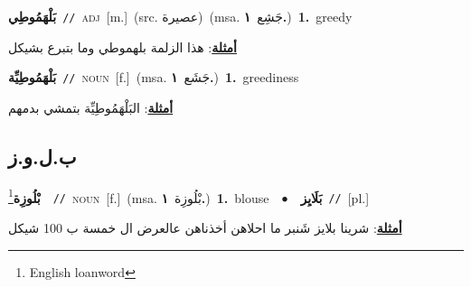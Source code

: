 \documentclass[10pt,a4paper,twoside]{article} %
\begin{document}
\begin{multicols}{2}
{\setlength\topsep{0pt}\textbf{\foreignlanguage{arabic}{بَلْهَمُوطِي}}\ {\color{gray}\texttt{//}\color{black}}\ \textsc{adj}\ [m.]\ (src. \color{gray}\foreignlanguage{arabic}{عصيرة}\color{black})\ \color{gray}(msa. \foreignlanguage{arabic}{جَشِع}~\foreignlanguage{arabic}{\textbf{١.}})\color{black}\ \textbf{1.}~greedy\  \begin{flushright}\color{gray}\foreignlanguage{arabic}{\textbf{\underline{\foreignlanguage{arabic}{أمثلة}}}: هذا الزلمة بلهموطي وما بتبرع بشيكل}\end{flushright}\color{black}} \vspace{2mm}

{\setlength\topsep{0pt}\textbf{\foreignlanguage{arabic}{بَلْهَمُوطِيِّة}}\ {\color{gray}\texttt{//}\color{black}}\ \textsc{noun}\ [f.]\ \color{gray}(msa. \foreignlanguage{arabic}{جَشَع}~\foreignlanguage{arabic}{\textbf{١.}})\color{black}\ \textbf{1.}~greediness\  \begin{flushright}\color{gray}\foreignlanguage{arabic}{\textbf{\underline{\foreignlanguage{arabic}{أمثلة}}}: البَلْهَمُوطِيِّة بتمشي بدمهم}\end{flushright}\color{black}} \vspace{2mm}

\vspace{-3mm}
\subsection*{\color{blue}\foreignlanguage{arabic}{ب.ل.و.ز}\color{blue}{ (ntws)}} 

{\setlength\topsep{0pt}\textbf{\foreignlanguage{arabic}{بْلُوزِة}}\footnote{English loanword}\ \ {\color{gray}\texttt{//}\color{black}}\ \textsc{noun}\ [f.]\ \color{gray}(msa. \foreignlanguage{arabic}{بْلُوزِة}~\foreignlanguage{arabic}{\textbf{١.}})\color{black}\ \textbf{1.}~blouse\ \ $\bullet$\ \ \setlength\topsep{0pt}\textbf{\foreignlanguage{arabic}{بَلَايِز}}\ {\color{gray}\texttt{//}\color{black}}\ [pl.]\  \begin{flushright}\color{gray}\foreignlanguage{arabic}{\textbf{\underline{\foreignlanguage{arabic}{أمثلة}}}: شرينا بلايز شَنبر ما احلاهن أخذناهن عالعرض ال خمسة ب 100 شيكل}\end{flushright}\color{black}} \vspace{2mm}


\end{multicols}
\end{document}
